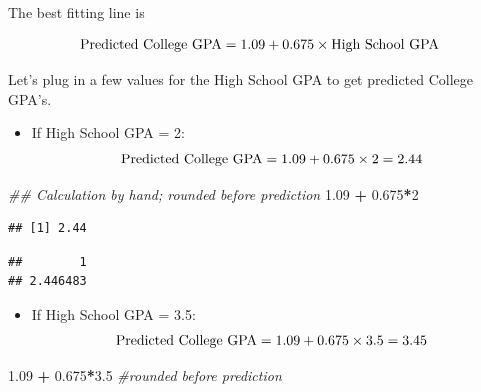 \documentclass[
]{book}
\newenvironment{Shaded}{\begin{snugshade}}{\end{snugshade}}
\newcommand{\CommentTok}[1]{\textcolor[rgb]{0.56,0.35,0.01}{\textit{#1}}}
\newcommand{\DataTypeTok}[1]{\textcolor[rgb]{0.13,0.29,0.53}{#1}}
\newcommand{\DecValTok}[1]{\textcolor[rgb]{0.00,0.00,0.81}{#1}}
\newcommand{\FloatTok}[1]{\textcolor[rgb]{0.00,0.00,0.81}{#1}}
\newcommand{\KeywordTok}[1]{\textcolor[rgb]{0.13,0.29,0.53}{\textbf{#1}}}
\newcommand{\NormalTok}[1]{#1}
\newcommand{\OperatorTok}[1]{\textcolor[rgb]{0.81,0.36,0.00}{\textbf{#1}}}
\newcommand{\StringTok}[1]{\textcolor[rgb]{0.31,0.60,0.02}{#1}}
\providecommand{\tightlist}{%
  \setlength{\itemsep}{0pt}\setlength{\parskip}{0pt}}
\begin{document}
The best fitting line is

\[ \hbox{Predicted College GPA} = 1.09 + 0.675 \times \hbox{High School GPA} \]

Let's plug in a few values for the High School GPA to get predicted College GPA's.

\begin{itemize}
\tightlist
\item
  If High School GPA = 2:\\
  \[ \hbox{Predicted College GPA} = 1.09 + 0.675 \times 2 = 2.44 \]
\end{itemize}

\begin{Shaded}
\begin{Highlighting}[]
\CommentTok{## Calculation by hand; rounded before prediction}
\FloatTok{1.09} \OperatorTok{+}\StringTok{ }\FloatTok{0.675}\OperatorTok{*}\DecValTok{2}
\end{Highlighting}
\end{Shaded}

\begin{verbatim}
## [1] 2.44
\end{verbatim}

\begin{Shaded}
\end{Shaded}

\begin{verbatim}
##        1 
## 2.446483
\end{verbatim}

\begin{itemize}
\tightlist
\item
  If High School GPA = 3.5:\\
  \[ \hbox{Predicted College GPA} = 1.09 + 0.675 \times 3.5 = 3.45 \]
\end{itemize}

\begin{Shaded}
\begin{Highlighting}[]
\FloatTok{1.09} \OperatorTok{+}\StringTok{ }\FloatTok{0.675}\OperatorTok{*}\FloatTok{3.5} \CommentTok{#rounded before prediction}
\end{Highlighting}
\end{Shaded}
\end{document}

